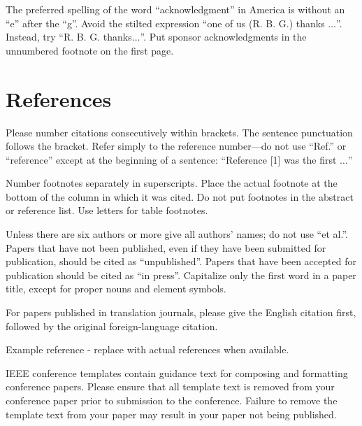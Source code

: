 \documentclass[conference]{IEEEtran}
\begin{document}
The preferred spelling of the word ``acknowledgment'' in America is without 
an ``e'' after the ``g''. Avoid the stilted expression ``one of us (R. B. 
G.) thanks $\ldots$''. Instead, try ``R. B. G. thanks$\ldots$''. Put sponsor 
acknowledgments in the unnumbered footnote on the first page.

\section*{References}

Please number citations consecutively within brackets. The 
sentence punctuation follows the bracket. Refer simply to the reference 
number---do not use ``Ref.'' or ``reference'' except at 
the beginning of a sentence: ``Reference [1] was the first $\ldots$''

Number footnotes separately in superscripts. Place the actual footnote at 
the bottom of the column in which it was cited. Do not put footnotes in the 
abstract or reference list. Use letters for table footnotes.

Unless there are six authors or more give all authors' names; do not use 
``et al.''. Papers that have not been published, even if they have been 
submitted for publication, should be cited as ``unpublished''. Papers 
that have been accepted for publication should be cited as ``in press''. 
Capitalize only the first word in a paper title, except for proper nouns and 
element symbols.

For papers published in translation journals, please give the English 
citation first, followed by the original foreign-language citation.

\begin{thebibliography}{00}

 Example reference - replace with actual references when available.

\end{thebibliography}
\vspace{12pt}
\color{red}
IEEE conference templates contain guidance text for composing and formatting conference papers. Please ensure that all template text is removed from your conference paper prior to submission to the conference. Failure to remove the template text from your paper may result in your paper not being published.
\end{document}
